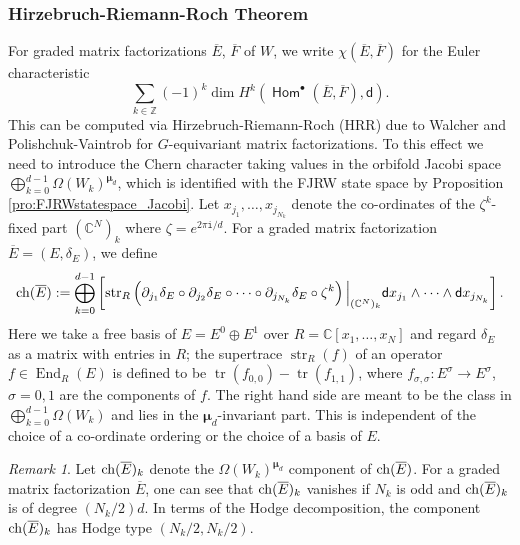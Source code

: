 \documentclass[11pt]{amsart}
\theoremstyle{definition} %
\theoremstyle{remark} %
\newtheorem{rem}[thm]{Remark}%
\newcommand{\CC}{\mathbb C}
\newcommand{\ZZ}{\mathbb Z}
\newcommand{\End}{\operatorname{End}}
\newcommand{\ch}{{\rm ch}}
\def\MF{\operatorname{\mathsf{MF}}}
\def\ol{\overline}
\newcommand{\bmu}{\boldsymbol{\mu}}
\newcommand{\dd}{\mathsf{d}}
\newcommand{\sfHom}{\operatorname{\mathsf{Hom}}}
\newcommand{\str}{\operatorname{str}}
\newcommand{\tr}{\operatorname{tr}}
\newcommand{\ov}{\overline}
\newcommand{\iu}{\mathtt{i}}
\begin{document}
\subsubsection{Hirzebruch-Riemann-Roch Theorem}
\label{subsubsec:HRR} 
For graded matrix factorizations $\ov{E}$, $\ov{F}$ of $W$,  
we write $\chi(\ov{E}, \ov{F})$ for the 
Euler characteristic 
\[
\sum_{k\in \ZZ} (-1)^k \dim 
H^k\left(\sfHom^\bullet(\ol E,\ol F), \dd
\right).  
\]
This can be computed via Hirzebruch-Riemann-Roch (HRR) 
due to Walcher \cite{Walcher} and Polishchuk-Vaintrob \cite{PVmf} 
for $G$-equivariant matrix factorizations. 
To this effect we need to introduce 
the Chern character taking values in the 
orbifold Jacobi space $\bigoplus_{k=0}^{d-1} 
\Omega(W_k)^{\bmu_d}$, which is identified 
with the FJRW state space by Proposition 
\ref{pro:FJRWstatespace_Jacobi}. 
Let $x_{j_1},\dots,x_{j_{N_k}}$ denote 
the co-ordinates of the $\zeta^k$-fixed part $(\CC^N)_k$ 
where $\zeta = e^{2\pi\iu/d}$. 
For a graded matrix factorization 
$\ol E=(E, \delta_E)$,
we define \cite[Theorem 3.3.3]{PVmf}
\[
\ch(\ov{E}):=\bigoplus_{k=0}^{d-1} 
\left [
\str_R\left(
\partial_{j_1}\delta_E\circ 
\partial_{j_2}\delta_E \circ 
\cdots \circ 
\partial_{j_{N_k}}\delta_E 
\circ \zeta^k\right) \Big|_{(\CC^N)_k}
\dd x_{j_1} \wedge \cdots \wedge \dd x_{j_{N_k}} 
\right]. 
\]
Here we take a free basis of $E = E^0 \oplus E^1$ over 
$R=\CC[x_1,\dots,x_N]$ and regard $\delta_E$ 
as a matrix with entries in $R$; 
the supertrace $\str_R(f)$ of an operator 
$f\in \End_R(E)$ is defined to be 
$\tr(f_{0,0}) - \tr(f_{1,1})$, where 
$f_{\sigma,\sigma} \colon E^\sigma \to E^\sigma$, $\sigma=0,1$ are 
the components of $f$.  
The right hand side are meant to be the class 
in $\bigoplus_{k=0}^{d-1}\Omega(W_k)$ 
and lies in the $\bmu_d$-invariant part.
This is independent of the choice of a 
co-ordinate ordering or the choice of a 
basis of $E$. 

\begin{rem}
\label{rem:Hodgetype-ch} 
Let $\ch(\ov{E})_k$ denote the $\Omega(W_k)^{\bmu_d}$ 
component of $\ch(\ov{E})$. 
For a graded matrix factorization $\ov{E}$, 
one can see that $\ch(\ov{E})_k$ vanishes if 
$N_k$ is odd and $\ch(\ov{E})_k$ is of degree $(N_k /2)d$. 
In terms of the Hodge decomposition, 
the component 
$\ch(\ov{E})_k$ has Hodge type $(N_k/2,N_k/2)$. 
\end{rem} 
\end{document}
